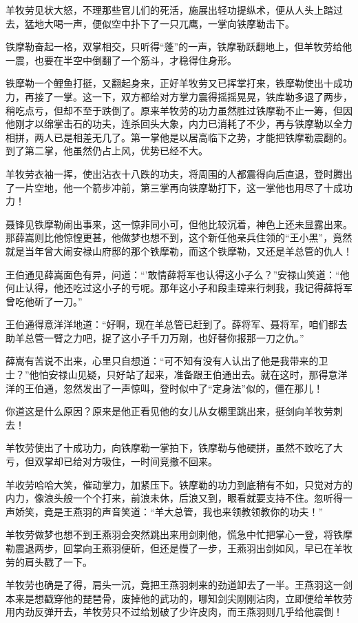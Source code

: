 \documentclass[12pt,oneside]{book}
\begin{document}
羊牧劳见状大怒，不理那些官儿们的死活，施展出轻功提纵术，便从人头上踏过去，猛地大喝一声，便似空中扑下了一只兀鹰，一掌向铁摩勒击下。

铁摩勒奋起一格，双掌相交，只听得``蓬''的一声，铁摩勒跃翻地上，但羊牧劳给他一震，也要在半空中倒翻了一个筋斗，才稳得住身形。

铁摩勒一个鲤鱼打挺，又翻起身来，正好羊牧劳又已挥掌打来，铁摩勒使出十成功力，再接了一掌。这一下，双方都给对方掌力震得摇摇晃晃，铁库勒多退了两步，稍吃点亏，但却不至于跌倒了。原来羊牧劳的功力虽然胜过铁摩勒不止一筹，但因他刚才以绵掌击石的功夫，连杀回头大象，内力已消耗了不少，再与铁摩勒以全力相拼，两人已是相差无几了。第一掌他是以居高临下之势，才能把铁摩勒震翻的。到了第二掌，他虽然仍占上风，优势已经不大。

羊牧劳衣袖一挥，使出沾衣十八跌的功夫，将周围的人都震得向后直退，登时腾出了一片空地，他一个箭步冲前，第三掌再向铁摩勒打下，这一掌他也用尽了十成功力！

聂锋见铁摩勒闹出事来，这一惊非同小可，但他比较沉着，神色上还未显露出来。那薛嵩则比他惊惶更甚，他做梦也想不到，这个新任他亲兵住领的``王小黑''，竟然就是当年曾大闹安禄山府邸的那个铁摩勒，而这个铁摩勒，又还是羊总管的仇人！

王伯通见薛嵩面色有异，问道：``'敢情薛将军也认得这小子么？''安禄山笑道：``他何止认得，他还吃过这小子的亏呢。那年这小子和段圭璋来行刺我，我记得薛将军曾吃他斫了一刀。''

王伯通得意洋洋地道：``好啊，现在羊总管已赶到了。薛将军、聂将军，咱们都去助羊总管一臂之力吧，捉了这小子千刀万剐，也好替你报那一刀之仇。''

薛嵩有苦说不出来，心里只自想道：``可不知有没有人认出了他是我带来的卫士？''他怕安禄山见疑，只好站了起来，准备跟王伯通出去。就在这时，那得意洋洋的王伯通，忽然发出了一声惊叫，登时似中了``定身法''似的，僵在那儿！

你道这是什么原因？原来是他正看见他的女儿从女棚里跳出来，挺剑向羊牧劳刺去！

羊牧劳使出了十成功力，向铁摩勒一掌拍下，铁摩勒与他硬拼，虽然不致吃了大亏，但双掌却已给对方吸住，一时间竞撤不回来。

羊收劳哈哈大笑，催动掌力，加紧压下。铁摩勒的功力到底稍有不如，只觉对方的内力，像浪头般一个个打来，前浪未休，后浪又到，眼看就要支持不住。忽听得一声娇笑，竟是王燕羽的声音笑道：``羊大总管，我也来领教领教你的功夫！''

羊牧劳做梦也想不到王燕羽会突然跳出来用剑刺他，慌急中忙把掌心一登，将铁摩勒震退两步，回掌向王燕羽便斫，但还是慢了一步，王燕羽出剑如风，早已在羊牧劳的肩头戳了一下。

羊牧劳也确是了得，肩头一沉，竟把王燕羽刺来的劲道卸去了一半。王燕羽这一剑本来是想戳穿他的琵琶骨，废掉他的武功的，哪知剑尖刚刚沾肉，立即便给羊牧劳用内劲反弹开去，羊牧劳只不过给划破了少许皮肉，而王燕羽则几乎给他震倒！
\end{document}
